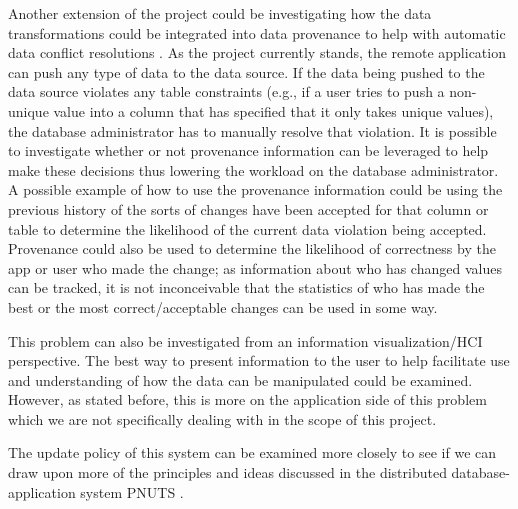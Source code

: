 \documentclass[12pt]{article}
\begin{document}
Another extension of the project could be investigating how the data transformations could be integrated into data provenance to help with automatic data conflict resolutions \cite{arniThesis}. As the project currently stands, the remote application can push any type of data to the data source. If the data being pushed to the data source violates any table constraints (e.g., if a user tries to push a non-unique value into a column that has specified that it only takes unique values), the database administrator has to manually resolve that violation. It is possible to investigate whether or not provenance information can be leveraged to help make these decisions thus lowering the workload on the database administrator. A possible example of how to use the provenance information could be using the previous history of the sorts of changes have been accepted for that column or table to determine the likelihood of the current data violation being accepted. Provenance could also be used to determine the likelihood of correctness by the app or user who made the change; as information about who has changed values can be tracked, it is not inconceivable that the statistics of who has made the best or the most correct/acceptable changes can be used in some way.

This problem can also be investigated from an information visualization/HCI perspective. The best way to present information to the user to help facilitate use and understanding of how the data can be manipulated could be examined. However, as stated before, this is more on the application side of this problem which we are not specifically dealing with in the scope of this project. 

The update policy of this system can be examined more closely to see if we can draw upon more of the principles and ideas discussed in the distributed database-application system PNUTS \cite{agrawal1997efficient}.



\end{document}
